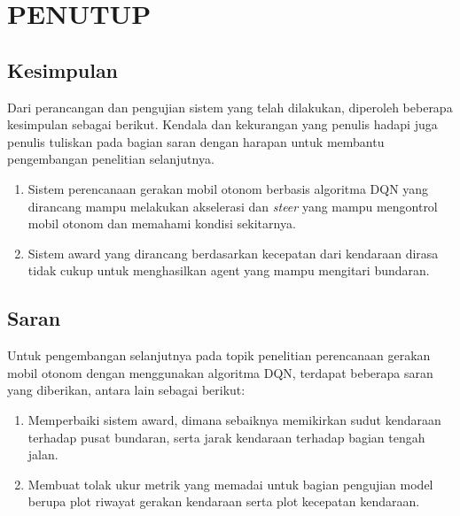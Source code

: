 \chapter{PENUTUP}
\label{chap:penutup}


\section{Kesimpulan}
\label{sec:kesimpulan}

Dari perancangan dan pengujian sistem yang telah dilakukan, diperoleh beberapa kesimpulan sebagai berikut. Kendala dan kekurangan yang penulis hadapi juga penulis tuliskan pada bagian saran dengan harapan untuk membantu pengembangan penelitian selanjutnya.

\begin{enumerate}[nolistsep]

  \item Sistem perencanaan gerakan mobil otonom berbasis algoritma DQN yang dirancang mampu melakukan akselerasi dan \textit{steer} yang mampu mengontrol mobil otonom dan memahami kondisi sekitarnya.

  \item Sistem award yang dirancang berdasarkan kecepatan dari kendaraan dirasa tidak cukup untuk menghasilkan agent yang mampu mengitari bundaran.

\end{enumerate}

\section{Saran}
\label{chap:saran}

Untuk pengembangan selanjutnya pada topik penelitian perencanaan gerakan mobil otonom dengan menggunakan algoritma DQN, terdapat beberapa saran yang diberikan, antara lain sebagai berikut:

\begin{enumerate}[nolistsep]

  \item Memperbaiki sistem award, dimana sebaiknya memikirkan sudut kendaraan terhadap pusat bundaran, serta jarak kendaraan terhadap bagian tengah jalan.

  \item Membuat tolak ukur metrik yang memadai untuk bagian pengujian model berupa plot riwayat gerakan kendaraan serta plot kecepatan kendaraan.

\end{enumerate}
